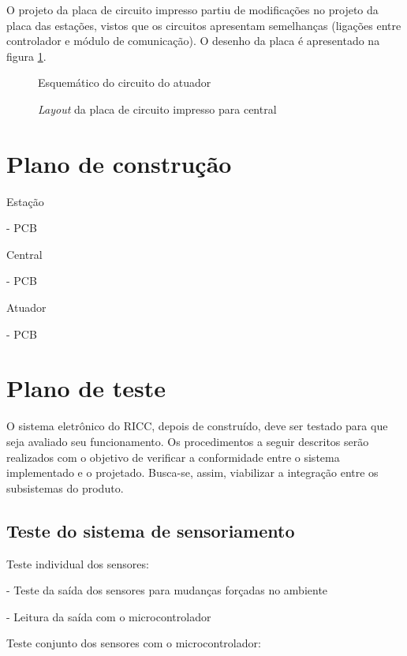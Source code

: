 O projeto da placa de circuito impresso partiu de modificações no projeto da placa das estações, vistos que os circuitos apresentam semelhanças (ligações entre controlador e módulo de comunicação). O desenho da placa é apresentado na figura \ref{ele_pc2_gab_08}.

\begin{figure}[H]
	\centering
	\caption{Esquemático do circuito do atuador}
	\label{ele_pc2_gab_08}
\end{figure}


\begin{figure}[H]
	\centering
	\caption{\emph{Layout} da placa de circuito impresso para central}
	\label{ele_pc2_gab_04}
\end{figure}		



\section{Plano de construção}

	Estação
		
		- PCB
	
	Central
		
		- PCB
		
	Atuador
	
		- PCB

\section{Plano de teste}

	O sistema eletrônico do RICC, depois de construído, deve ser testado para que seja avaliado seu funcionamento. Os procedimentos a seguir descritos serão realizados com o objetivo de verificar a conformidade entre o sistema implementado e o projetado. Busca-se, assim, viabilizar a integração entre os subsistemas do produto. 

	\subsection{Teste do sistema de sensoriamento}
		Teste individual dos sensores:
			
			- Teste da saída dos sensores para mudanças forçadas no ambiente
			
			- Leitura da saída com o microcontrolador
		
		Teste conjunto dos sensores com o microcontrolador:
		
